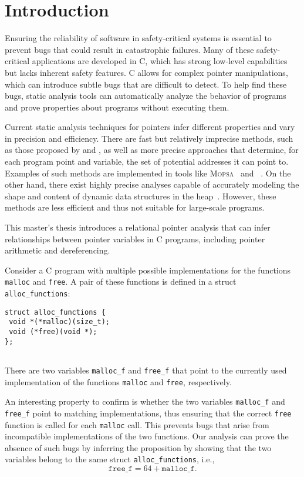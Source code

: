 
\chapter{Introduction}\label{chapter:introduction}

Ensuring the reliability of software in safety-critical systems is essential to prevent bugs that could result in catastrophic failures.
Many of these safety-critical applications are developed in C, which has strong low-level capabilities but lacks inherent safety features.
C allows for complex pointer manipulations, which can introduce subtle bugs that are difficult to detect.
To help find these bugs, static analysis tools can automatically analyze the behavior of programs and prove properties about programs without executing them.

Current static analysis techniques for pointers infer different properties and vary in precision and efficiency.
There are fast but relatively imprecise methods, such as those proposed by \textcite{Steensgaard} and \textcite{Andersen}, as well as more precise approaches that determine, for each program point and variable, the set of potential addresses it can point to.
Examples of such methods are implemented in tools like \textsc{Mopsa}~\cite{mopsa} and \goblint~\cite{goblint}.
On the other hand, there exist highly precise analyses capable of accurately modeling the shape and content of dynamic data structures in the heap~\cite{rivalpapers,kreiker,predator}.
However, these methods are less efficient and thus not suitable for large-scale programs.

This master's thesis introduces a relational pointer analysis that can infer relationships between pointer variables in C programs, including pointer arithmetic and dereferencing.
\begin{example}
    Consider a C program with multiple possible implementations for the functions \texttt{malloc} and \texttt{free}.
    A pair of these functions is defined in a struct \texttt{alloc\_functions}:
    \begin{verbatim}
struct alloc_functions {
 void *(*malloc)(size_t);
 void (*free)(void *);
};
    \end{verbatim}
    There are two variables \texttt{malloc\_f} and \texttt{free\_f} that point to the currently used implementation of the functions \texttt{malloc} and \texttt{free}, respectively.

    An interesting property to confirm is whether the two variables \texttt{malloc\_f} and \texttt{free\_f} point to matching implementations, thus ensuring that the correct \texttt{free} function is called for each \texttt{malloc} call.
    This prevents bugs that arise from incompatible implementations of the two functions.
    Our analysis can prove the absence of such bugs by inferring the proposition by showing that the two variables belong to the same struct \texttt{alloc\_functions}, i.e.,
    \[
        \texttt{free\_f} = 64 + \texttt{malloc\_f}.
    \]
\end{example}


